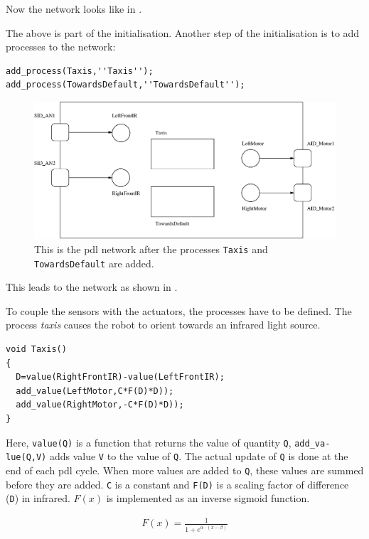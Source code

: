 Now the network looks like in .

The above is part of the initialisation. Another step of the initialisation is to add processes to the network:


{\small\begin{verbatim}
add_process(Taxis,''Taxis'');
add_process(TowardsDefault,''TowardsDefault'');
\end{verbatim}}

\begin{figure}
\centerline{\includegraphics[width=12cm]{robots//pdl_networkc.eps}}
\caption{This is the {\sc pdl} network after the processes \texttt{Taxis} and \texttt{TowardsDefault} are added.}
\label{f:robots:pdl_networkc}
\end{figure}


This leads to the network as shown in . 

To couple the sensors with the actuators, the processes have to be defined. The process {\em taxis} causes the robot to orient towards an infrared light source.


{\small\begin{verbatim}
void Taxis()
{
  D=value(RightFrontIR)-value(LeftFrontIR);
  add_value(LeftMotor,C*F(D)*D));
  add_value(RightMotor,-C*F(D)*D));
}
\end{verbatim}}


Here, \texttt{value(Q)} is a function that returns the value of quantity \texttt{Q}, {\tt add\_va-lue(Q,V)} adds value \texttt{V} to the value of \texttt{Q}. The actual update of \texttt{Q} is done at the end of each {\sc pdl} cycle. When more values are added to \texttt{Q}, these values are summed before they are added. \texttt{C} is a constant and \texttt{F(D)} is a scaling factor of difference (\texttt{D}) in infrared. $F(x)$ is implemented as an inverse sigmoid function.

\begin{eqnarray*}
F(x)=\frac{1}{1+e^{\alpha \cdot (x - \beta)}}
\end{eqnarray*}

